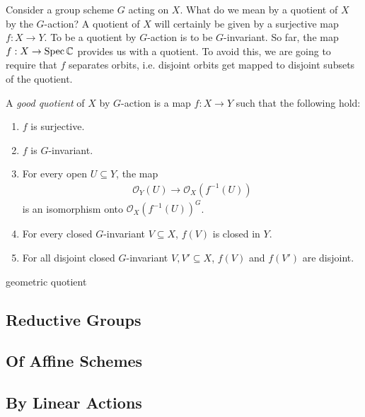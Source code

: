 \documentclass[12pt]{ociamthesis}  %
\begin{document}
Consider a group scheme $G$ acting on $X$. What do we mean by a
quotient of $X$ by the $G$-action? A quotient of $X$ will certainly
be given by a surjective map $f : X\to Y$. To be a quotient by $G$-action
is to be $G$-invariant. So far, the map $f : X\to\operatorname{Spec}\mathbb{C}$
provides us with a quotient. To avoid this, we are going to require
that $f$ separates orbits, i.e. disjoint orbits get mapped to
disjoint subsets of the quotient.


\begin{definition}
  A \emph{good quotient} of $X$ by $G$-action is a map
  $f : X\to Y$ such that the following hold:
  \begin{enumerate}
    \item $f$ is surjective.
    \item $f$ is $G$-invariant.
    \item For every open $U\subseteq Y$, the map
      \begin{align*}
        \mathcal O_Y(U)\to \mathcal O_X({f}^{-1}(U))
      \end{align*}
      is an isomorphism
      onto $\mathcal O_X({f}^{-1}(U))^G$.
    \item For every closed $G$-invariant $V\subseteq X$,
      $f(V)$ is closed in $Y$.
    \item For all disjoint closed $G$-invariant $V,V'\subseteq X$,
      $f(V)$ and $f(V')$ are disjoint.
  \end{enumerate}
\end{definition}

\begin{definition}
  geometric quotient
\end{definition}

\subsection{Reductive Groups}

\missingsection

\subsection{Of Affine Schemes}

\missingsection

\subsection{By Linear Actions}
\end{document}
